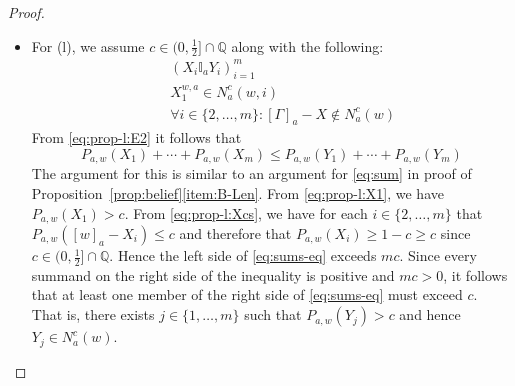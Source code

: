 \documentclass[12pt]{article}
\theoremstyle{definition}
\newcommand{\Rat}{\mathbb{Q}}  %
\begin{document}
\begin{proof}
\begin{itemize}
  \item For (l), we assume $c\in(0,\frac 12]\cap\Rat$ along with the
    following:
    \begin{eqnarray}
      &&
      (X_i\mathbb{I}_aY_i)_{i=1}^m
      \label{eq:prop-l:E2} 
      \\ &&
      X_1^{w,a}\in N^c_a(w,i) 
      \label{eq:prop-l:X1} 
      \\ && 
      \forall i\in\{2,\dots,m\}: [\Gamma]_a-X\notin N^c_a(w) 
      \label{eq:prop-l:Xcs} 
    \end{eqnarray}
    From \eqref{eq:prop-l:E2} it follows that
    \begin{equation}
      P_{a,w} (X_1)+\cdots+P_{a,w}(X_m)\leq
      P_{a,w}(Y_1)+\cdots+ P_{a,w}(Y_m)
      \label{eq:sums-eq}
    \end{equation}
    The argument for this is similar to an argument for \eqref{eq:sum}
    in proof of Proposition~\ref{prop:belief}\eqref{item:B-Len}.  From
    \eqref{eq:prop-l:X1}, we have $P_{a,w}(X_1)>c$.  From
    \eqref{eq:prop-l:Xcs}, we have for each $i\in\{2,\dots,m\}$ that
    $P_{a,w}([w]_a-X_i)\leq c$ and therefore that $P_{a,w}(X_i)\geq
    1-c\geq c$ since $c\in(0,\frac 12]\cap\Rat$.  Hence the left side
    of \eqref{eq:sums-eq} exceeds $mc$.  Since every summand on the
    right side of the inequality is positive and $mc>0$, it follows
    that at least one member of the right side of \eqref{eq:sums-eq}
    must exceed $c$.  That is, there exists $j\in\{1,\dots,m\}$ such
    that $P_{a,w}(Y_j) > c$ and hence $Y_j\in N^c_a(w)$.  \qedhere
  \end{itemize}
\end{proof}
\end{document}
